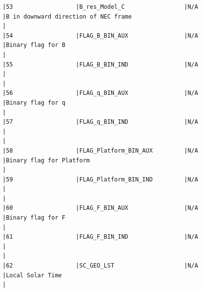 \begin{verbatim}
|53                  |B_res_Model_C                 |N/A                           |B in downward direction of NEC frame                                                                |
|54                  |FLAG_B_BIN_AUX                |N/A                           |Binary flag for B                                                                                   |
|55                  |FLAG_B_BIN_IND                |N/A                           |                                                                                                    |
|56                  |FLAG_q_BIN_AUX                |N/A                           |Binary flag for q                                                                                   |
|57                  |FLAG_q_BIN_IND                |N/A                           |                                                                                                    |
|58                  |FLAG_Platform_BIN_AUX         |N/A                           |Binary flag for Platform                                                                            |
|59                  |FLAG_Platform_BIN_IND         |N/A                           |                                                                                                    |
|60                  |FLAG_F_BIN_AUX                |N/A                           |Binary flag for F                                                                                   |
|61                  |FLAG_F_BIN_IND                |N/A                           |                                                                                                    |
|62                  |SC_GEO_LST                    |N/A                           |Local Solar Time                                                                                    |
\end{verbatim}